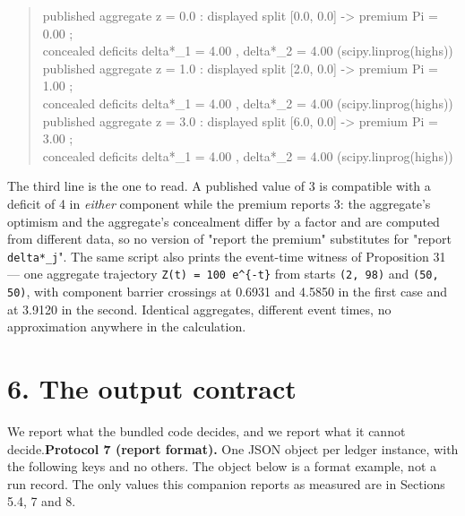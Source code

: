 \documentclass[11pt]{article}
\begin{document}
\begin{quote}\ttfamily\footnotesize\raggedright\setlength{\parskip}{0pt}
published aggregate z =  0.0 :  displayed split [0.0, 0.0] -> premium Pi =  0.00 ;\\
                                 concealed deficits delta*\_1 = 4.00 , delta*\_2 = 4.00   (scipy.linprog(highs))\\
published aggregate z =  1.0 :  displayed split [2.0, 0.0] -> premium Pi =  1.00 ;\\
                                 concealed deficits delta*\_1 = 4.00 , delta*\_2 = 4.00   (scipy.linprog(highs))\\
published aggregate z =  3.0 :  displayed split [6.0, 0.0] -> premium Pi =  3.00 ;\\
                                 concealed deficits delta*\_1 = 4.00 , delta*\_2 = 4.00   (scipy.linprog(highs))
\end{quote}

The third line is the one to read. A published value of 3 is compatible with a deficit of 4 in \emph{either} component while the premium reports 3: the aggregate's optimism and the aggregate's concealment differ by a factor and are computed from different data, so no version of "report the premium" substitutes for "report \texttt{delta*\_j}". The same script also prints the event-time witness of Proposition 31 --- one aggregate trajectory \texttt{Z(t) = 100 e\allowbreak{}\textasciicircum{}\{-\allowbreak{}t\}} from starts \texttt{(2, 98)} and \texttt{(50, 50)}, with component barrier crossings at 0.6931 and 4.5850 in the first case and at 3.9120 in the second. Identical aggregates, different event times, no approximation anywhere in the calculation.

\vspace{0.8em}

\section*{6. The output contract}\label{6-the-output-contract}

We report what the bundled code decides, and we report what it cannot decide.\textbf{Protocol 7 (report format).} One JSON object per ledger instance, with the following keys and no others. The object below is a format example, not a run record. The only values this companion reports as measured are in Sections 5.4, 7 and 8.
\end{document}
